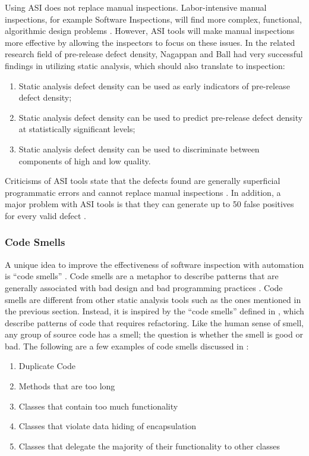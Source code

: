 Using ASI does not replace manual inspections. Labor-intensive manual
inspections, for example Software Inspections, will find more complex,
functional, algorithmic design problems \cite{NagappanWPSV04}. However, ASI
tools will make manual inspections more effective by allowing the
inspectors to focus on these issues. In the related research field of
pre-release defect density, Nagappan and Ball \cite{NagappanB05} had very
successful findings in utilizing static analysis, which should also
translate to inspection:

\begin{enumerate}
\item Static analysis defect density can be used as early indicators of
  pre-release defect density;
\item Static analysis defect density can be used to predict pre-release
  defect density at statistically significant levels;
\item Static analysis defect density can be used to discriminate between
  components of high and low quality.
\end{enumerate}
  
Criticisms of ASI tools state that the defects found are generally
superficial programmatic errors and cannot replace manual inspections
\cite{vanEmden02}. In addition, a major problem with ASI tools is that they
can generate up to 50 false positives for every valid defect
\cite{NagappanWPSV04}.


\subsubsection{Code Smells}
A unique idea to improve the effectiveness of software inspection with
automation is ``code smells'' \cite{vanEmden02}. Code smells are a metaphor
to describe patterns that are generally associated with bad design and bad
programming practices \cite{vanEmden02}. Code smells are different from
other static analysis tools such as the ones mentioned in the previous
section. Instead, it is inspired by the ``code smells'' defined in
\cite{Fowler99}, which describe patterns of code that requires refactoring.
Like the human sense of smell, any group of source code has a smell; the
question is whether the smell is good or bad. The following are a few
examples of code smells discussed in \cite{vanEmden02}:

\begin{enumerate}
\item Duplicate Code
\item Methods that are too long
\item Classes that contain too much functionality
\item Classes that violate data hiding of encapsulation
\item Classes that delegate the majority of their functionality to other
  classes
\end{enumerate}

